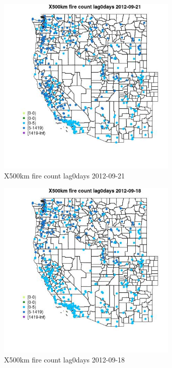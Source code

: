 \begin{figure} 
\centering  
\includegraphics[width=0.77\textwidth]{Code_Outputs/Report_ML_input_PM25_Step4_part_e_de_duplicated_aves_compiled_2019-05-14wNAs_MapObsX500km_fire_count_lag0days2012-09-21.jpg} 
\caption{\label{fig:Report_ML_input_PM25_Step4_part_e_de_duplicated_aves_compiled_2019-05-14wNAsMapObsX500km_fire_count_lag0days2012-09-21}X500km fire count lag0days 2012-09-21} 
\end{figure} 
 

\begin{figure} 
\centering  
\includegraphics[width=0.77\textwidth]{Code_Outputs/Report_ML_input_PM25_Step4_part_e_de_duplicated_aves_compiled_2019-05-14wNAs_MapObsX500km_fire_count_lag0days2012-09-18.jpg} 
\caption{\label{fig:Report_ML_input_PM25_Step4_part_e_de_duplicated_aves_compiled_2019-05-14wNAsMapObsX500km_fire_count_lag0days2012-09-18}X500km fire count lag0days 2012-09-18} 
\end{figure} 
 

